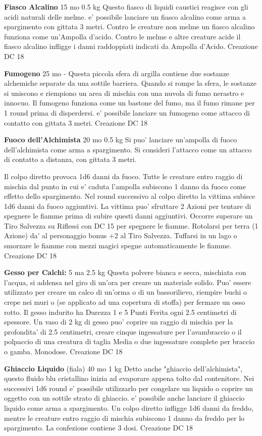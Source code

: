 \documentclass[a4paper,11pt,twoside,openany]{book}
\begin{document}
{\textbf{Fiasco Alcalino} 15 mo 0.5 kg Questo fiasco di liquidi caustici reagisce con gli acidi naturali delle melme. e' possibile lanciare un fiasco alcalino come arma a spargimento con gittata 3 metri. Contro le creature non melme un fiasco alcalino funziona come un'Ampolla d'acido. Contro le melme e altre creature acide il fiasco alcalino infligge i danni raddoppiati indicati da Ampolla d'Acido. Creazione DC 18

\textbf{Fumogeno} 25 mo - Questa piccola sfera di argilla contiene due sostanze alchemiche separate da una sottile barriera. Quando si rompe la sfera, le sostanze si uniscono e riempiono un area di mischia con una nuvola di fumo nerastro e innocuo. Il fumogeno funziona come un bastone del fumo, ma il fumo rimane per 1 round prima di disperdersi. e' possibile lanciare un fumogeno come attacco di contatto con gittata 3 metri. Creazione DC 18

\textbf{Fuoco dell'Alchimista} 20 mo 0.5 kg Si puo' lanciare un'ampolla di fuoco dell'alchimista come arma a spargimento. Si consideri l'attacco come un attacco di contatto a distanza, con gittata 3 metri.

Il colpo diretto provoca 1d6 danni da fuoco. Tutte le creature entro raggio di mischia dal punto in cui e' caduta l'ampolla subiscono 1 danno da fuoco come effetto dello spargimento. Nel round successivo al colpo diretto la vittima subisce 1d6 danni da fuoco aggiuntivi. La vittima puo' sfruttare 2 Azioni per tentare di spegnere le fiamme prima di subire questi danni aggiuntivi. Occorre superare un Tiro Salvezza su Riflessi con DC 15 per spegnere le fiamme. Rotolarsi per terra (1 Azione) da' al personaggio bonus +2 al Tiro Salvezza. Tuffarsi in un lago o smorzare le fiamme con mezzi magici spegne automaticamente le fiamme. Creazione DC 18

\textbf{Gesso per Calchi:} 5 ma 2.5 kg Questa polvere bianca e secca, mischiata con l’acqua, si addensa nel giro di un’ora per creare un materiale solido. Puo' essere utilizzato per creare un calco di un’orma o di un bassorilievo, riempire buchi o crepe nei muri o (se applicato ad una copertura di stoffa) per fermare un osso rotto. Il gesso indurito ha Durezza 1 e 5 Punti Ferita ogni 2.5 centimetri di spessore. Un vaso di 2 kg di gesso puo' coprire un raggio di mischia per la profondita' di 2.5 centimetri, creare cinque ingessature per l’avambraccio o il polpaccio di una creatura di taglia Media o due ingessature complete per braccio o gamba. Monodose. Creazione DC 18

\textbf{Ghiaccio Liquido} (fiala) 40 mo 1 kg Detto anche "ghiaccio dell'alchimista", questo fluido blu cristallino inizia ad evaporare appena tolto dal contenitore. Nei successivi 1d6 round e' possibile utilizzarlo per congelare un liquido o coprire un oggetto con un sottile strato di ghiaccio. e' possibile anche lanciare il ghiaccio liquido come arma a spargimento. Un colpo diretto infligge 1d6 danni da freddo, mentre le creature entro raggio di mischia subiscono 1 danno da freddo per lo spargimento. La confezione contiene 3 dosi. Creazione DC 18

}
\end{document}
